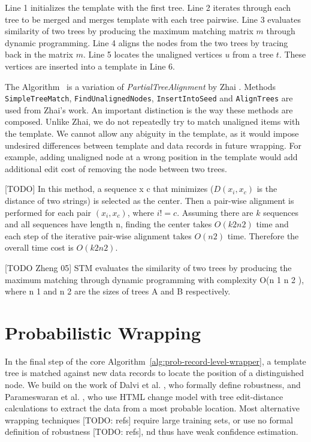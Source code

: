 Line 1 initializes the template with the first tree. Line 2 iterates through each tree to be merged and merges template with each tree pairwise. Line 3 evaluates similarity of two trees by producing the maximum matching matrix $m$ through dynamic programming. Line 4 aligns the nodes from the two trees by tracing back in the matrix $m$. Line 5 locates the unaligned vertices $u$ from a tree $t$. These vertices are inserted into a template in Line 6.

The Algorithm~\cite{alg:merging-data-records} is a variation of \emph{PartialTreeAlignment} by Zhai \cite{zhai2005a}. Methods \texttt{SimpleTreeMatch}, \texttt{FindUnalignedNodes}, \texttt{InsertIntoSeed} and \texttt{AlignTrees} are used from Zhai's work. An important distinction is the way these methods are composed. Unlike Zhai, we do not repeatedly try to match unaligned items with the template. We cannot allow any abiguity in the template, as it would impose undesired differences between template and data records in future wrapping. For example, adding unaligned node at a wrong position in the template would add additional edit cost of removing the node between two trees.

[TODO]
In this method, a sequence x c that minimizes ($D(x_i, x_c)$ is the distance of two strings)
is selected as the center. Then a pair-wise alignment is performed
for each pair $(x_i, x_c)$, where $i != c$. Assuming there are $k$ sequences
and all sequences have length n, finding the center takes $O(k 2 n 2 )$
time and each step of the iterative pair-wise alignment takes $O(n 2 )$
time. Therefore the overall time cost is $O(k 2 n 2 )$.

[TODO Zheng 05] STM evaluates the similarity of two trees by producing the maximum matching through dynamic programming with complexity O(n 1 n 2 ), where n 1 and n 2 are the sizes of trees A and B respectively.


\section{Probabilistic Wrapping}

In the final step of the core Algorithm~\ref{alg:prob-record-level-wrapper}, a template tree is matched against new data records to locate the position of a distinguished node. We build on the work of Dalvi et al. \cite{dalvi2009a}, who formally define robustness, and Parameswaran et al. \cite{DBLP:journals/pvldb/ParameswaranDGR11}, who use HTML change model with tree edit-distance calculations to extract the data from a most probable location. Most alternative wrapping techniques [TODO: refs] require large training sets, or use no formal definition of robustness [TODO: refs], 
nd thus have weak confidence estimation.

